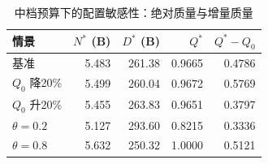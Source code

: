\begin{table}[!htbp]
\centering
\songti{}
\setlength{\tabcolsep}{4pt}
\caption{中档预算下的配置敏感性：绝对质量与增量质量}
\label{tab:q3-sensitive-full}
\begin{tabular}{lrrrr}
\toprule
情景 & $N^*$ (B) & $D^*$ (B) & $Q^*$ & $Q^*-Q_0$ \\
\midrule
基准 & 5.483 & 261.38 & 0.9665 & 0.4786 \\
$Q_0$ 降20\% & 5.499 & 260.04 & 0.9672 & 0.5769 \\
$Q_0$ 升20\% & 5.455 & 263.83 & 0.9651 & 0.3797 \\
$\theta=0.2$ & 5.127 & 293.60 & 0.8215 & 0.3336 \\
$\theta=0.8$ & 5.632 & 250.32 & 1.0000 & 0.5121 \\
\bottomrule
\end{tabular}
\end{table}
